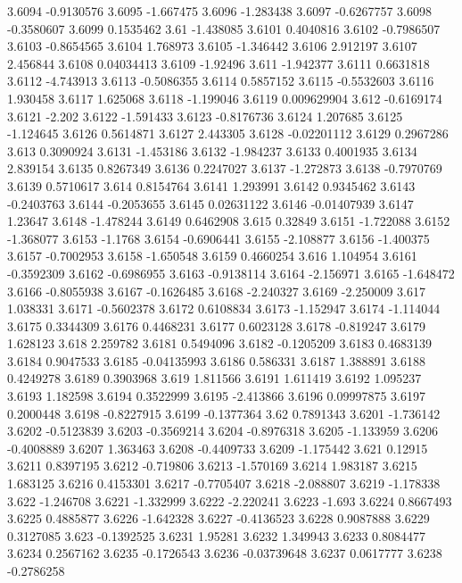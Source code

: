 3.6094  -0.9130576
3.6095  -1.667475
3.6096  -1.283438
3.6097  -0.6267757
3.6098  -0.3580607
3.6099  0.1535462
3.61  -1.438085
3.6101  0.4040816
3.6102  -0.7986507
3.6103  -0.8654565
3.6104  1.768973
3.6105  -1.346442
3.6106  2.912197
3.6107  2.456844
3.6108  0.04034413
3.6109  -1.92496
3.611  -1.942377
3.6111  0.6631818
3.6112  -4.743913
3.6113  -0.5086355
3.6114  0.5857152
3.6115  -0.5532603
3.6116  1.930458
3.6117  1.625068
3.6118  -1.199046
3.6119  0.009629904
3.612  -0.6169174
3.6121  -2.202
3.6122  -1.591433
3.6123  -0.8176736
3.6124  1.207685
3.6125  -1.124645
3.6126  0.5614871
3.6127  2.443305
3.6128  -0.02201112
3.6129  0.2967286
3.613  0.3090924
3.6131  -1.453186
3.6132  -1.984237
3.6133  0.4001935
3.6134  2.839154
3.6135  0.8267349
3.6136  0.2247027
3.6137  -1.272873
3.6138  -0.7970769
3.6139  0.5710617
3.614  0.8154764
3.6141  1.293991
3.6142  0.9345462
3.6143  -0.2403763
3.6144  -0.2053655
3.6145  0.02631122
3.6146  -0.01407939
3.6147  1.23647
3.6148  -1.478244
3.6149  0.6462908
3.615  0.32849
3.6151  -1.722088
3.6152  -1.368077
3.6153  -1.1768
3.6154  -0.6906441
3.6155  -2.108877
3.6156  -1.400375
3.6157  -0.7002953
3.6158  -1.650548
3.6159  0.4660254
3.616  1.104954
3.6161  -0.3592309
3.6162  -0.6986955
3.6163  -0.9138114
3.6164  -2.156971
3.6165  -1.648472
3.6166  -0.8055938
3.6167  -0.1626485
3.6168  -2.240327
3.6169  -2.250009
3.617  1.038331
3.6171  -0.5602378
3.6172  0.6108834
3.6173  -1.152947
3.6174  -1.114044
3.6175  0.3344309
3.6176  0.4468231
3.6177  0.6023128
3.6178  -0.819247
3.6179  1.628123
3.618  2.259782
3.6181  0.5494096
3.6182  -0.1205209
3.6183  0.4683139
3.6184  0.9047533
3.6185  -0.04135993
3.6186  0.586331
3.6187  1.388891
3.6188  0.4249278
3.6189  0.3903968
3.619  1.811566
3.6191  1.611419
3.6192  1.095237
3.6193  1.182598
3.6194  0.3522999
3.6195  -2.413866
3.6196  0.09997875
3.6197  0.2000448
3.6198  -0.8227915
3.6199  -0.1377364
3.62  0.7891343
3.6201  -1.736142
3.6202  -0.5123839
3.6203  -0.3569214
3.6204  -0.8976318
3.6205  -1.133959
3.6206  -0.4008889
3.6207  1.363463
3.6208  -0.4409733
3.6209  -1.175442
3.621  0.12915
3.6211  0.8397195
3.6212  -0.719806
3.6213  -1.570169
3.6214  1.983187
3.6215  1.683125
3.6216  0.4153301
3.6217  -0.7705407
3.6218  -2.088807
3.6219  -1.178338
3.622  -1.246708
3.6221  -1.332999
3.6222  -2.220241
3.6223  -1.693
3.6224  0.8667493
3.6225  0.4885877
3.6226  -1.642328
3.6227  -0.4136523
3.6228  0.9087888
3.6229  0.3127085
3.623  -0.1392525
3.6231  1.95281
3.6232  1.349943
3.6233  0.8084477
3.6234  0.2567162
3.6235  -0.1726543
3.6236  -0.03739648
3.6237  0.0617777
3.6238  -0.2786258
